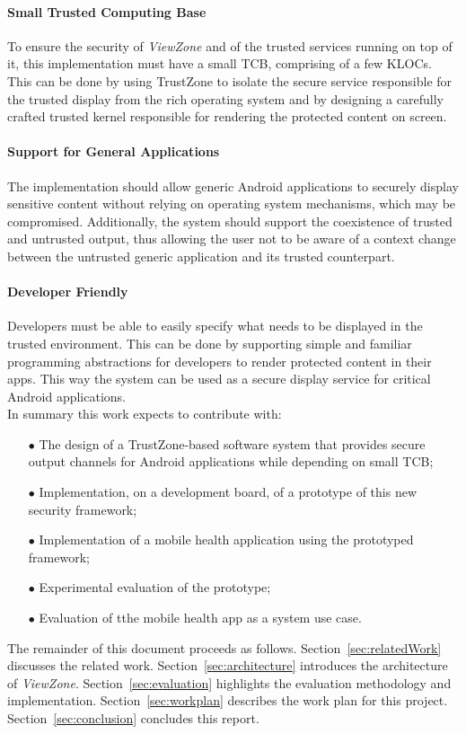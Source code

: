 \paragraph*{\textbf{Small Trusted Computing Base\\}} To ensure the security of \emph{ViewZone} and of the trusted services running on top of it, this implementation must have a small \ac{TCB}, comprising of a few KLOCs. This can be done by using TrustZone to isolate the secure service responsible for the trusted display from the rich operating system and by designing a carefully crafted trusted kernel responsible for rendering the protected content on screen.

\paragraph*{\textbf{Support for General Applications\\}} The implementation should allow generic Android applications to securely display sensitive content without relying on operating system mechanisms, which may be compromised. Additionally, the system should support the coexistence of trusted and untrusted output, thus allowing the user not to be aware of a context change between the untrusted generic application and its trusted counterpart.

\paragraph*{\textbf{Developer Friendly\\}} Developers must be able to easily specify what needs to be displayed in the trusted environment. This can be done by supporting simple and familiar programming abstractions for developers to render protected content in their apps. This way the system can be used as a secure display service for critical Android applications.\\

In summary this work expects to contribute with:
\begin{itemize}
	\item[$\bullet$] The design of a TrustZone-based software system that provides secure output channels for Android applications while depending on small TCB;
	\item[$\bullet$] Implementation, on a development board, of a prototype of this new security framework;
	\item[$\bullet$] Implementation of a mobile health application using the prototyped framework;
	\item[$\bullet$] Experimental evaluation of the prototype;
	\item[$\bullet$] Evaluation of tthe mobile health app as a system use case.
\end{itemize}

%
The remainder of this document proceeds as follows. Section~\ref{sec:relatedWork} discusses the related work. Section~\ref{sec:architecture} introduces the architecture of \emph{ViewZone}. Section~\ref{sec:evaluation} highlights the evaluation methodology and implementation. Section~\ref{sec:workplan} describes the work plan for this project. Section~\ref{sec:conclusion} concludes this report.